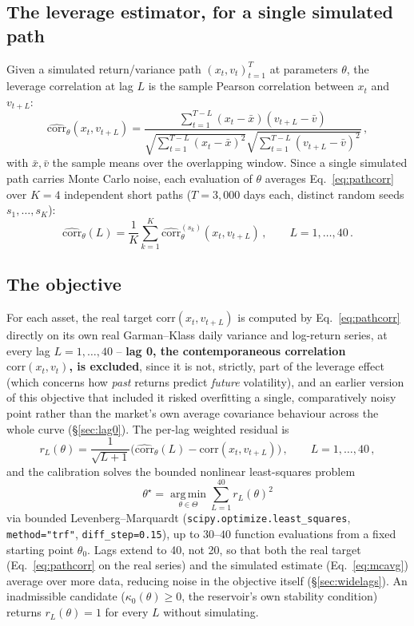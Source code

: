 \documentclass[11pt]{article}
\begin{document}
\subsection{The leverage estimator, for a single simulated path}
Given a simulated return/variance path $(x_t,v_t)_{t=1}^{T}$ at parameters
$\theta$, the leverage correlation at lag $L$ is the sample Pearson
correlation between $x_t$ and $v_{t+L}$:
\begin{equation}
\widehat{\text{corr}}_\theta(x_t,v_{t+L}) =
\frac{\sum_{t=1}^{T-L}(x_t-\bar x)(v_{t+L}-\bar v)}
{\sqrt{\sum_{t=1}^{T-L}(x_t-\bar x)^2}\sqrt{\sum_{t=1}^{T-L}(v_{t+L}-\bar v)^2}}\, ,
\label{eq:pathcorr}
\end{equation}
with $\bar x,\bar v$ the sample means over the overlapping window. Since a
single simulated path carries Monte Carlo noise, each evaluation of $\theta$
averages Eq.~\ref{eq:pathcorr} over $K=4$ independent short paths ($T=3{,}000$
days each, distinct random seeds $s_1,\dots,s_K$):
\begin{equation}
\widehat{\text{corr}}_\theta(L) = \frac{1}{K}\sum_{k=1}^{K}
\widehat{\text{corr}}_\theta^{(s_k)}(x_t,v_{t+L})\, ,\qquad L=1,\dots,40\, .
\label{eq:mcavg}
\end{equation}

\subsection{The objective}
For each asset, the real target $\text{corr}(x_t,v_{t+L})$ is computed by
Eq.~\ref{eq:pathcorr} directly on its own real Garman--Klass daily variance
and log-return series, at every lag $L=1,\dots,40$ -- \textbf{lag 0, the
contemporaneous correlation $\text{corr}(x_t,v_t)$, is excluded}, since it is
not, strictly, part of the leverage effect (which concerns how \emph{past}
returns predict \emph{future} volatility), and an earlier version of this
objective that included it risked overfitting a single, comparatively noisy
point rather than the market's own average covariance behaviour across the
whole curve (\S\ref{sec:lag0}). The per-lag weighted residual is
\begin{equation}
r_L(\theta) = \frac{1}{\sqrt{L+1}}\Big(\widehat{\text{corr}}_\theta(L) -
\text{corr}(x_t,v_{t+L})\Big)\, ,\qquad L=1,\dots,40\, ,
\label{eq:objective}
\end{equation}
and the calibration solves the bounded nonlinear least-squares problem
\begin{equation}
\theta^\star = \operatorname*{arg\,min}_{\theta\in\Theta}
\sum_{L=1}^{40} r_L(\theta)^2
\label{eq:argmin}
\end{equation}
via bounded Levenberg--Marquardt (\texttt{scipy.optimize.least\_squares},
\texttt{method="trf"}, \texttt{diff\_step=0.15}), up to $30$--$40$ function
evaluations from a fixed starting point $\theta_0$. Lags extend to 40, not
20, so that both the real target (Eq.~\ref{eq:pathcorr} on the real series)
and the simulated estimate (Eq.~\ref{eq:mcavg}) average over more data,
reducing noise in the objective itself (\S\ref{sec:widelags}). An
inadmissible candidate ($\kappa_0(\theta)\ge0$, the reservoir's own stability
condition) returns $r_L(\theta)=1$ for every $L$ without simulating.
\end{document}
